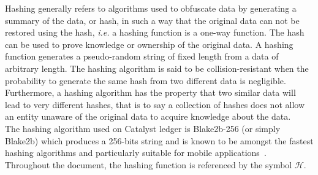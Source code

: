 Hashing generally refers to algorithms used to obfuscate data by generating a summary of the data, or hash, in such a way that the original data can not be restored using the hash, \textit{i.e.} a hashing function is a one-way function. The hash can be used to prove knowledge or ownership of the original data. A hashing function generates a pseudo-random string of fixed length from a data of arbitrary length. The hashing algorithm is said to be collision-resistant when the probability to generate the same hash from two different data is negligible. Furthermore, a hashing algorithm has the property that two similar data will lead to very different hashes, that is to say a collection of hashes does not allow an entity unaware of the original data to acquire knowledge about the data. \\ 

The hashing algorithm used on Catalyst ledger is Blake2b-256 (or simply Blake2b) which produces a 256-bits string and is known to be amongst the fastest hashing algorithms and particularly suitable for mobile applications~\cite{blake}. Throughout the document, the hashing function is referenced by the symbol $\mathcal{H}$.
